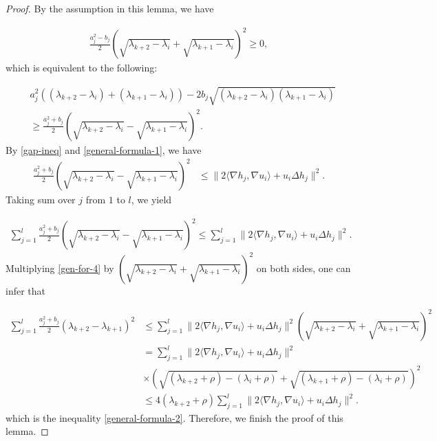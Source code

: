 \documentclass[12pt]{article}
\numberwithin{equation}{section}
\begin{document}
\begin{proof}By the assumption in this lemma, we have

\begin{equation*}\begin{aligned}\frac{a_{j}^{2}-b_{j}}{2}
\left(\sqrt{\lambda_{k+2}-\lambda_{i}}+\sqrt{\lambda_{k+1}-\lambda_{i}}\right)^{2}\geq0,\end{aligned}\end{equation*}
which is equivalent to the following:

\begin{equation}\begin{aligned}\label{gap-ineq}&a_{j}^{2}((\lambda_{k+2}-\lambda_{i})+(\lambda_{k+1}-\lambda_{i}))
-2b_{j}\sqrt{(\lambda_{k+2}-\lambda_{i})(\lambda_{k+1}-\lambda_{i})}\\&\geq\frac{a_{j}^{2}+b_{j}}{2}
\left(\sqrt{\lambda_{k+2}-\lambda_{i}}-\sqrt{\lambda_{k+1}-\lambda_{i}}\right)^{2}.\end{aligned}\end{equation}
By \eqref{gap-ineq} and \eqref{general-formula-1}, we have
\begin{equation*}\begin{aligned}\frac{a_{j}^{2}+b_{j}}{2}
\left(\sqrt{\lambda_{k+2}-\lambda_{i}}-\sqrt{\lambda_{k+1}-\lambda_{i}}\right)^{2}
&\leq\|2\langle\nabla h_{j},\nabla u_{i}\rangle+u_{i}\Delta h_{j}\|^{2}.
\end{aligned}\end{equation*}
Taking sum over $j$ from $1$ to $l$, we yield

\begin{equation}\begin{aligned}\label{gen-for-4}\sum_{j=1}^{l}\frac{a_{j}^{2}+b_{j}}{2}\left(\sqrt{\lambda_{k+2}-\lambda_{i}}-\sqrt{\lambda_{k+1}-\lambda_{i}}\right)^{2} \leq\sum_{j=1}^{l}\|2\langle\nabla h_{j},\nabla u_{i}\rangle+u_{i}\Delta h_{j}\|^{2}.
\end{aligned}\end{equation}
Multiplying \eqref{gen-for-4} by
$\left(\sqrt{\lambda_{k+2}-\lambda_{i}}+\sqrt{\lambda_{k+1}-\lambda_{i}}\right)^{2}$ on both sides, one can infer that



\begin{equation*}\begin{aligned}\sum_{j=1}^{l}\frac{a_{j}^{2}+b_{j}}{2}\left(\lambda_{k+2}-\lambda_{k+1}\right)^{2}
&\leq\sum_{j=1}^{l}\|2\langle\nabla h_{j},\nabla u_{i}\rangle+u_{i}\Delta h_{j}\|^{2}\left(\sqrt{\lambda_{k+2}-\lambda_{i}}+\sqrt{\lambda_{k+1}-\lambda_{i}}\right)^{2}\\
&=\sum_{j=1}^{l}\|2\langle\nabla h_{j},\nabla u_{i}\rangle+u_{i}\Delta h_{j}\|^{2}\\&\times\left(\sqrt{(\lambda_{k+2}+\rho)-(\lambda_{i}+\rho)}+\sqrt{(\lambda_{k+1}+\rho)-(\lambda_{i}+\rho)}\right)^{2}\\
&\leq4(\lambda_{k+2}+\rho)\sum_{j=1}^{l}\|2\langle\nabla h_{j},\nabla u_{i}\rangle+u_{i}\Delta h_{j}\|^{2}
.
\end{aligned}\end{equation*}
which is the inequality \eqref{general-formula-2}.
Therefore, we finish the proof of this lemma.


\end{proof}
\end{document}
